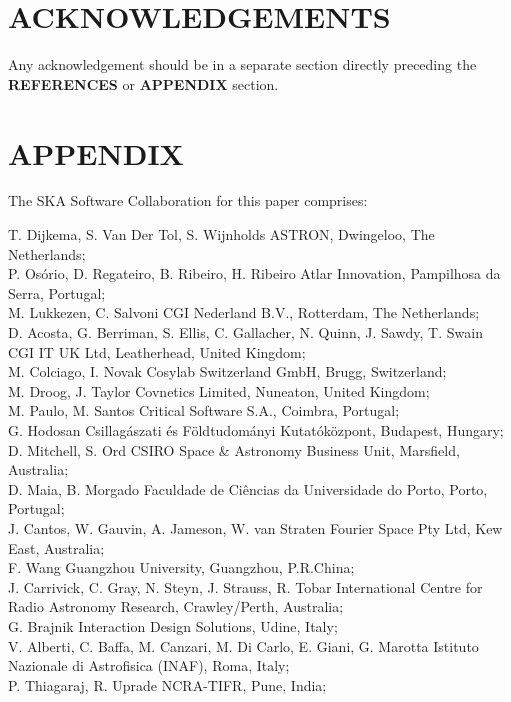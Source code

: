 \documentclass[a4paper,
               biblatex,     %
               keeplastbox,   %
               ]{jacow}
\begin{document}
\section{ACKNOWLEDGEMENTS}
Any acknowledgement should be in a separate section directly preceding
the \textbf{REFERENCES} or \textbf{APPENDIX} section.


\section{APPENDIX}
The SKA Software Collaboration for this paper comprises:

T. Dijkema,
S. Van Der Tol,
S. Wijnholds ASTRON, Dwingeloo, The Netherlands;\\
P. Osório,
D. Regateiro,
B. Ribeiro,
H. Ribeiro Atlar Innovation, Pampilhosa da Serra, Portugal;\\
M. Lukkezen,
C. Salvoni CGI Nederland B.V., Rotterdam, The Netherlands;\\
D. Acosta,
G. Berriman,
S. Ellis,
C. Gallacher,
N. Quinn,
J. Sawdy,
T. Swain CGI IT UK Ltd, Leatherhead, United Kingdom;\\
M. Colciago,
I. Novak Cosylab Switzerland GmbH, Brugg, Switzerland;\\
M. Droog,
J. Taylor Covnetics Limited, Nuneaton, United Kingdom;\\
M. Paulo,
M. Santos Critical Software S.A., Coimbra, Portugal;\\
G. Hodosan Csillagászati és Földtudományi Kutatóközpont, Budapest, Hungary;\\
D. Mitchell,
S. Ord CSIRO Space \& Astronomy Business Unit, Marsfield, Australia;\\
D. Maia,
B. Morgado Faculdade de Ciências da Universidade do Porto, Porto, Portugal;\\
J. Cantos,
W. Gauvin,
A. Jameson,
W. van Straten Fourier Space Pty Ltd, Kew East, Australia;\\
F. Wang Guangzhou University, Guangzhou, P.R.China;\\
J. Carrivick,
C. Gray,
N. Steyn,
J. Strauss,
R. Tobar International Centre for Radio Astronomy Research, Crawley/Perth, Australia;\\
G. Brajnik Interaction Design Solutions, Udine, Italy;\\
V. Alberti,
C. Baffa,
M. Canzari,
M. Di Carlo,
E. Giani,
G. Marotta Istituto Nazionale di Astrofisica (INAF), Roma, Italy;\\
P. Thiagaraj,
R. Uprade NCRA-TIFR, Pune, India;\\
\end{document}
